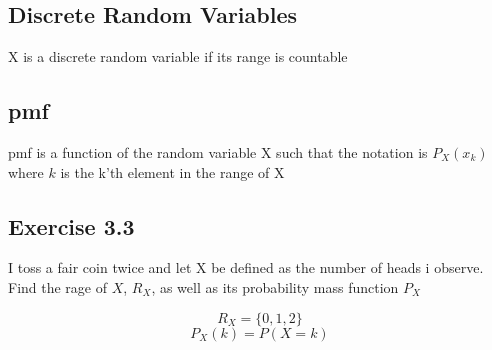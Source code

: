 \documentclass{article}
\begin{document}
\subsection*{Discrete Random Variables}
X is a discrete random variable if its range is countable
\subsection*{\acrfull{pmf}}
\acrshort{pmf} is a function of the random variable X such that the notation is $P_X(x_k)$ where $k$ is the k'th element in the range of X
\subsection*{Exercise 3.3}
I toss a fair coin twice and let X be defined as the number of heads i observe. Find the rage of $X$, $R_X$, as well as its probability mass function $P_X$

$$R_X=\{0, 1, 2\}$$
$$P_X(k)=P(X=k)$$
\end{document}
